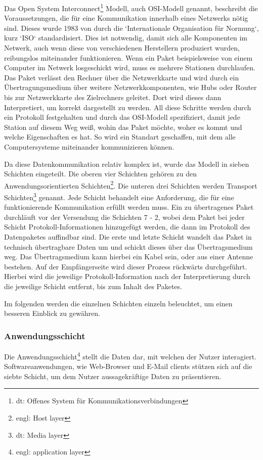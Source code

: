 \documentclass[12pt]{article}
\begin{document}
	


	Das Open System Interconnect\footnote{dt: Offenes System für Kommunikationsverbindungen} Modell, auch OSI-Modell genannt, beschreibt die Voraussetzungen, die für eine Kommunikation innerhalb eines Netzwerks nötig sind. Dieses wurde 1983 von durch die `Internationale Organisation für Normung`, kurz `ISO` standardisiert. Dies ist notwendig, damit sich alle Komponenten im Netwerk, auch wenn diese von verschiedenen Herstellern produziert wurden, reibungslos miteinander funktionieren. Wenn ein Paket beispielsweise von einem Computer im Netwerk losgeschickt wird, muss es mehrere Stationen durchlaufen. Das Paket verlässt den Rechner über die Netzwerkkarte und wird durch ein Übertragungsmedium über weitere Netzwerkkomponenten, wie Hubs oder Router bis zur Netzwerkkarte des Zielrechners geleitet. Dort wird dieses dann Interpretiert, um korrekt dargestellt zu werden. All diese Schritte werden durch ein Protokoll festgehalten und durch das OSI-Modell spezifiziert, damit jede Station auf diesem Weg weiß, wohin das Paket möchte, woher es kommt und welche Eigenschaften es hat. So wird ein Standart geschaffen, mit dem alle Computersysteme miteinander kommunizieren können.
	
	Da diese  Datenkommunikation relativ komplex ist, wurde das Modell in sieben Schichten eingeteilt. Die oberen vier Schichten gehören zu den Anwendungsorientierten Schichten\footnote{engl: Host layer}. Die unteren drei Schichten werden Transport Schichten\footnote{dt: Media layer} genannt. Jede Schicht behandelt eine Anforderung, die für eine funktionierende Kommunikation erfüllt werden muss. Ein zu übertragenes Paket durchläuft vor der Versendung die Schichten 7 - 2, wobei dem Paket bei jeder Schicht Protokoll-Informationen hinzugefügt werden, die dann im Protokoll des Datenpaketes auffindbar sind. Die erste und letzte Schicht wandelt das Paket in technisch übertragbare Daten um und schickt dieses über das Übertragsmedium weg. Das Übertragsmedium kann hierbei ein Kabel sein, oder aus einer Antenne bestehen. Auf der Empfängerseite wird dieser Prozess rückwärts durchgeführt. Hierbei wird die jeweilige Protokoll-Information nach der Interpretierung durch die jeweilige Schicht entfernt, bis zum Inhalt des Paketes.
	
	Im folgenden werden die einzelnen Schichten  einzeln beleuchtet, um einen besseren Einblick zu gewähren.

\subsubsection{Anwendungsschicht}
	Die Anwendungsschicht\footnote{engl: application layer} stellt die Daten dar, mit welchen der Nutzer interagiert. Softwareanwendungen, wie Web-Browser und E-Mail clients stützen sich auf die siebte Schicht, um dem Nutzer aussagekräftige Daten zu präsentieren. 
	
\end{document}
